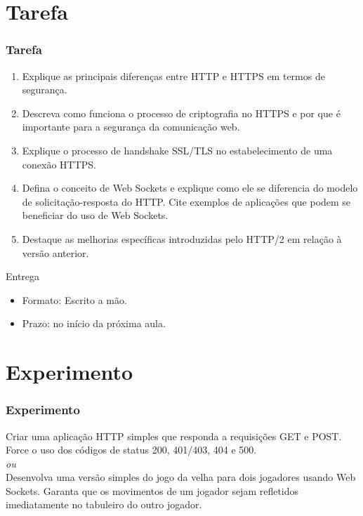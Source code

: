 \documentclass[
	10pt, %
	t, %
]{beamer}
\begin{document}
\section{Tarefa}

\begin{frame}
	\frametitle{Tarefa}

	\begin{enumerate}
		\item Explique as principais diferenças entre HTTP e HTTPS em termos de segurança.
		\item Descreva como funciona o processo de criptografia no HTTPS e por que é importante para a segurança da comunicação web.
		\item Explique o processo de handshake SSL/TLS no estabelecimento de uma conexão HTTPS.
		\item Defina o conceito de Web Sockets e explique como ele se diferencia do modelo de solicitação-resposta do HTTP. Cite exemplos de aplicações que podem se beneficiar do uso de Web Sockets.
		\item Destaque as melhorias específicas introduzidas pelo HTTP/2 em relação à versão anterior.
	\end{enumerate}

	\begin{alertblock}{Entrega}
		\begin{itemize}
			\item Formato: Escrito a mão.
			\item Prazo: no início da próxima aula.
		\end{itemize}
	\end{alertblock}

\end{frame}

\section{Experimento}

\begin{frame}
	\frametitle{Experimento}

	Criar uma aplicação HTTP simples que responda a requisições GET e POST. Force o uso dos códigos de status 200, 401/403, 404 e 500.\\
	\bigskip \textit{ou}\\ \bigskip
	Desenvolva uma versão simples do jogo da velha para dois jogadores usando Web Sockets. Garanta que os movimentos de um jogador sejam refletidos imediatamente no tabuleiro do outro jogador.


\end{frame}
\end{document}

